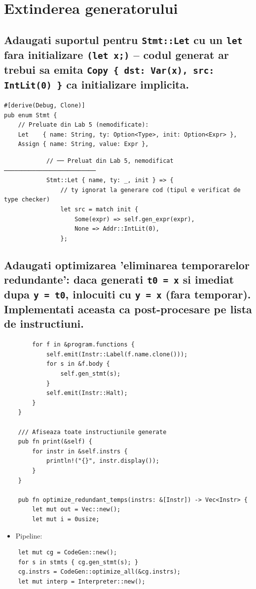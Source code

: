\documentclass[11pt]{article}
\begin{document}
\section{Extinderea generatorului}
\label{sec:org5830313}
\subsection{Adaugati suportul pentru \texttt{Stmt::Let} cu un \texttt{let} fara initializare \texttt{(let x;)} -- codul generat ar trebui sa emita \texttt{Copy \{ dst: Var(x), src: IntLit(0) \}} ca initializare implicita.}
\label{sec:org0934c0d}
\begin{verbatim}
#[derive(Debug, Clone)]
pub enum Stmt {
    // Preluate din Lab 5 (nemodificate):
    Let    { name: String, ty: Option<Type>, init: Option<Expr> },
    Assign { name: String, value: Expr },
\end{verbatim}
\begin{verbatim}
            // ── Preluat din Lab 5, nemodificat ──────────────────────────
            Stmt::Let { name, ty: _, init } => {
                // ty ignorat la generare cod (tipul e verificat de type checker)
                let src = match init {
                    Some(expr) => self.gen_expr(expr),
                    None => Addr::IntLit(0),
                };
\end{verbatim}
\subsection{Adaugati optimizarea 'eliminarea temporarelor redundante': daca generati \texttt{t0 = x} si imediat dupa \texttt{y = t0}, inlocuiti cu \texttt{y = x} (fara temporar). Implementati aceasta ca post-procesare pe lista de instructiuni.}
\label{sec:orgaf0c5b7}
\begin{verbatim}
        for f in &program.functions {
            self.emit(Instr::Label(f.name.clone()));
            for s in &f.body {
                self.gen_stmt(s);
            }
            self.emit(Instr::Halt);
        }
    }

    /// Afiseaza toate instructiunile generate
    pub fn print(&self) {
        for instr in &self.instrs {
            println!("{}", instr.display());
        }
    }

    pub fn optimize_redundant_temps(instrs: &[Instr]) -> Vec<Instr> {
        let mut out = Vec::new();
        let mut i = 0usize;
\end{verbatim}
\begin{itemize}
\item Pipeline:
\end{itemize}
\begin{verbatim}
    let mut cg = CodeGen::new();
    for s in stmts { cg.gen_stmt(s); }
    cg.instrs = CodeGen::optimize_all(&cg.instrs);
    let mut interp = Interpreter::new();
\end{verbatim}
\end{document}
